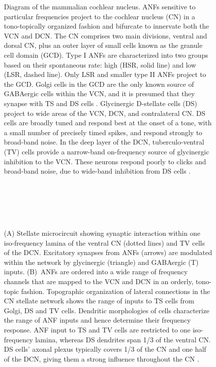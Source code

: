  \begin{figure}[pt!]
\centering
   \caption[Diagram of the mammalian cochlear nucleus]{Diagram of the mammalian cochlear nucleus. {ANF}s
     sensitive to particular frequencies project to the cochlear
     nucleus (CN) in a tono-topically organized fashion and bifurcate
     to innervate both the {VCN} and {DCN}. The {CN} comprises
     two main divisions, ventral and dorsal CN, plus an outer layer of
     small cells known as the granule cell domain (GCD). Type I
     {ANF}s are characterized into two groups based on their
     spontaneous rate: high (HSR, solid line) and low (LSR, dashed
     line). Only LSR and smaller type II {ANF}s project to the {GCD}.
     Golgi cells in the {GCD} are the only known source of {GABA}ergic
     cells within the VCN, and it is presumed that they synapse with
     TS and DS cells \citep{FerragamoGoldingEtAl:1998}. Glycinergic
     D-stellate cells (DS) project to wide areas of the VCN, DCN,
     and contralateral {CN}. DS cells are broadly tuned and respond
     best at the onset of a tone, with a small number of precisely
     timed spikes, and respond strongly to broad-band noise.  In the
     deep layer of the DCN, tuberculo-ventral (TV) cells provide
     a narrow-band on-frequency source of glycinergic inhibition to
     the VCN. These neurons respond poorly to clicks and
     broad-band noise, due to wide-band inhibition from DS cells
     \citep{SpirouDavisEtAl:1999}.}
\label{fig:GA:CNdiagram}
 \end{figure}


\begin{figure}[t!]
\centering
{}\hspace{3in}\\
\\
\hspace{3in}\\
\\
\caption[CN stellate microcircuit]{(A) Stellate microcircuit showing synaptic interaction within
  one iso-frequency lamina of the ventral {CN} (dotted lines) and TV
  cells of the {DCN}\@. Excitatory synapses from {ANF}s (arrows)
  are modulated within the network by glycinergic (triangle) and
  GABAergic (T) inputs. (B)~ANFs are ordered into a wide range of
  frequency channels that are mapped to the {VCN} and {DCN} in an orderly, tono-topic fashion. Topographic organization of
  lateral connections in the {CN} stellate network shows the range of
  inputs to TS cells from Golgi, DS and TV cells. Dendritic
  morphologies of cells characterize the range of {ANF} inputs and
  hence determine their frequency response. {ANF} input to TS and TV
  cells are restricted to one iso-frequency lamina, whereas DS
  dendrites span 1/3 of the ventral CN\@. DS cells' axonal plexus
  typically covers 1/3 of the {CN} and one half of the DCN, giving them a strong influence throughout the {CN}
  \citep{ArnottWallaceEtAl:2004}.}\label{fig:GA:MicroCN}
\end{figure}

